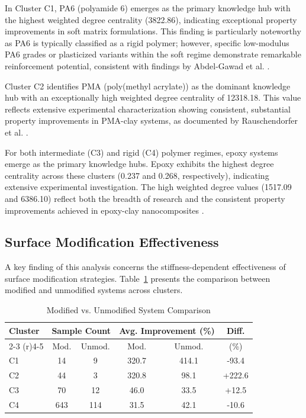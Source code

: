 \documentclass[conference]{IEEEtran}
\begin{document}
In Cluster C1, PA6 (polyamide 6) emerges as the primary knowledge hub with the highest weighted degree centrality (3822.86), indicating exceptional property improvements in soft matrix formulations. This finding is particularly noteworthy as PA6 is typically classified as a rigid polymer; however, specific low-modulus PA6 grades or plasticized variants within the soft regime demonstrate remarkable reinforcement potential, consistent with findings by Abdel-Gawad et al. \cite{abdel2022fabrication}.

Cluster C2 identifies PMA (poly(methyl acrylate)) as the dominant knowledge hub with an exceptionally high weighted degree centrality of 12318.18. This value reflects extensive experimental characterization showing consistent, substantial property improvements in PMA-clay systems, as documented by Rauschendorfer et al. \cite{rauschendorfer2020tuning}.

For both intermediate (C3) and rigid (C4) polymer regimes, epoxy systems emerge as the primary knowledge hubs. Epoxy exhibits the highest degree centrality across these clusters (0.237 and 0.268, respectively), indicating extensive experimental investigation. The high weighted degree values (1517.09 and 6386.10) reflect both the breadth of research and the consistent property improvements achieved in epoxy-clay nanocomposites \cite{azeez2013epoxy, shettar2020experimental, tcherbi2016effects}.

\subsection{Surface Modification Effectiveness}

A key finding of this analysis concerns the stiffness-dependent effectiveness of surface modification strategies. Table~\ref{tab:modification} presents the comparison between modified and unmodified systems across clusters.

\begin{table}[htbp]
\caption{Modified vs. Unmodified System Comparison}
\begin{center}
\begin{tabular}{@{}lccccc@{}}
\toprule
Cluster & \multicolumn{2}{c}{Sample Count} & \multicolumn{2}{c}{Avg. Improvement (\%)} & Diff. \\
\cmidrule(r){2-3} \cmidrule(r){4-5}
 & Mod. & Unmod. & Mod. & Unmod. & (\%) \\
\midrule
C1 & 14 & 9 & 320.7 & 414.1 & -93.4 \\
C2 & 44 & 3 & 320.8 & 98.1 & +222.6 \\
C3 & 70 & 12 & 46.0 & 33.5 & +12.5 \\
C4 & 643 & 114 & 31.5 & 42.1 & -10.6 \\
\bottomrule
\end{tabular}
\label{tab:modification}
\end{center}
\end{table}
\end{document}
